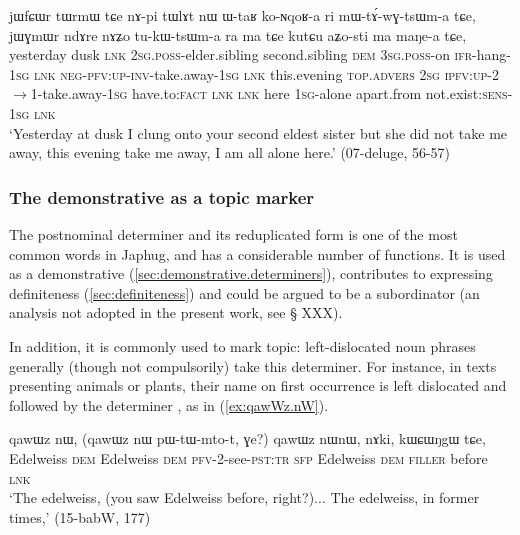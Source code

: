 \begin{exe}
\ex \label{ex:jWGmWr.ndAre}
\gll jɯfɕɯr tɯrmɯ tɕe nɤ-pi tɯlɤt nɯ ɯ-taʁ ko-ɴqoʁ-a ri mɯ-tɤ́-wɣ-tsɯm-a tɕe,
jɯɣmɯr ndɤre nɤʑo tu-kɯ-tsɯm-a ra ma tɕe kutɕu aʑo-sti ma maŋe-a tɕe, \\
 yesterday dusk \textsc{lnk} \textsc{2sg}.\textsc{poss}-elder.sibling  second.sibling \textsc{dem} \textsc{3sg}.\textsc{poss}-on \textsc{ifr}-hang-\textsc{1sg} \textsc{lnk} \textsc{neg}-\textsc{pfv:up}-\textsc{inv}-take.away-\textsc{1sg} \textsc{lnk} this.evening \textsc{top.advers}  \textsc{2sg} \textsc{ipfv}:\textsc{up}-2$\rightarrow$1-take.away-\textsc{1sg} have.to:\textsc{fact} \textsc{lnk} \textsc{lnk} here \textsc{1sg}-alone apart.from  not.exist:\textsc{sens}-\textsc{1sg} \textsc{lnk}  \\
\glt  `Yesterday at dusk I clung onto your second eldest sister but she did not take me away, this evening take me away, I am all alone here.' (07-deluge, 56-57)
\end{exe}

\subsubsection{The demonstrative  as a topic marker} \label{sec:nW.topic}
The postnominal determiner  and its reduplicated form  is one of the most common words in Japhug, and has a considerable number of functions. It is used as a demonstrative (\ref{sec:demonstrative.determiners}), contributes to expressing definiteness (\ref{sec:definiteness}) and could be argued to be a subordinator (an analysis not adopted in the present work, see § XXX).

In addition, it is commonly used to mark topic: left-dislocated noun phrases generally (though not compulsorily) take this determiner. For instance, in texts presenting animals or plants, their name on first occurrence is left dislocated and followed by the determiner , as in (\ref{ex:qawWz.nW}).

\begin{exe}
\ex \label{ex:qawWz.nW}
\gll  qawɯz nɯ, (qawɯz nɯ pɯ-tɯ-mto-t, ɣe?)  qawɯz nɯnɯ, nɤki, kɯɕɯŋgɯ tɕe, \\
Edelweiss \textsc{dem} Edelweiss \textsc{dem} \textsc{pfv}-2-see-\textsc{pst}:\textsc{tr} \textsc{sfp} Edelweiss \textsc{dem} \textsc{filler} before \textsc{lnk} \\
\glt `The edelweiss, (you saw Edelweiss before, right?)... The edelweiss, in former times,' (15-babW, 177)
\end{exe}

